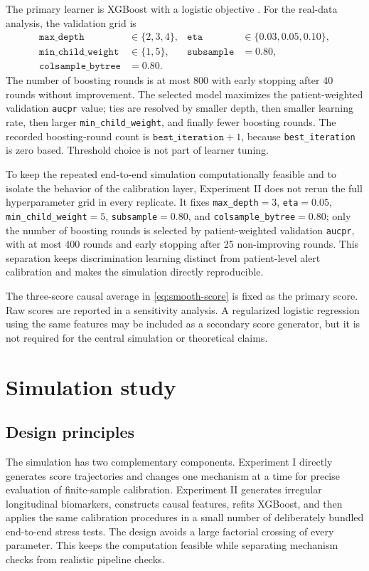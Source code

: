 \documentclass[11pt]{article}
\begin{document}
The primary learner is XGBoost with a logistic objective \citep{chen2016xgboost}. For the real-data analysis, the validation grid is
\begin{align*}
\texttt{max\_depth}&\in\{2,3,4\},&
\texttt{eta}&\in\{0.03,0.05,0.10\},\\
\texttt{min\_child\_weight}&\in\{1,5\},&
\texttt{subsample}&=0.80,\\
\texttt{colsample\_bytree}&=0.80.&&
\end{align*}
The number of boosting rounds is at most 800 with early stopping after 40 rounds without improvement. The selected model maximizes the patient-weighted validation \texttt{aucpr} value; ties are resolved by smaller depth, then smaller learning rate, then larger \texttt{min\_child\_weight}, and finally fewer boosting rounds. The recorded boosting-round count is $\texttt{best\_iteration}+1$, because \texttt{best\_iteration} is zero based. Threshold choice is not part of learner tuning.

To keep the repeated end-to-end simulation computationally feasible and to isolate the behavior of the calibration layer, Experiment II does not rerun the full hyperparameter grid in every replicate. It fixes \texttt{max\_depth}$=3$, \texttt{eta}$=0.05$, \texttt{min\_child\_weight}$=5$, \texttt{subsample}$=0.80$, and \texttt{colsample\_bytree}$=0.80$; only the number of boosting rounds is selected by patient-weighted validation \texttt{aucpr}, with at most 400 rounds and early stopping after 25 non-improving rounds. This separation keeps discrimination learning distinct from patient-level alert calibration and makes the simulation directly reproducible.

The three-score causal average in \eqref{eq:smooth-score} is fixed as the primary score. Raw scores are reported in a sensitivity analysis. A regularized logistic regression using the same features may be included as a secondary score generator, but it is not required for the central simulation or theoretical claims.

\section{Simulation study}\label{sec:simulation}

\subsection{Design principles}

The simulation has two complementary components. Experiment I directly generates score trajectories and changes one mechanism at a time for precise evaluation of finite-sample calibration. Experiment II generates irregular longitudinal biomarkers, constructs causal features, refits XGBoost, and then applies the same calibration procedures in a small number of deliberately bundled end-to-end stress tests. The design avoids a large factorial crossing of every parameter. This keeps the computation feasible while separating mechanism checks from realistic pipeline checks.
\end{document}
